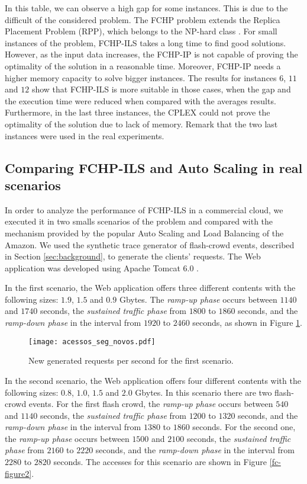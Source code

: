 	In this table, we can observe a high gap for some instances. This is due to the difficult of the considered problem. The FCHP problem extends the Replica Placement Problem (RPP), which belongs to the NP-hard class \cite{aioffi05}. For small instances of the problem,  FCHP-ILS   takes a long time to find good solutions. However, as the input data increases, the FCHP-IP is not capable of proving the optimality of the solution in a reasonable time. Moreover,  FCHP-IP needs a higher memory capacity to solve bigger instances.  The results for instances $6$, $11$ and $12$ show that FCHP-ILS is more suitable in those cases, when  the gap and the execution time were reduced when compared with the averages results. Furthermore, in the last three instances, the CPLEX could not prove the optimality of the solution due to lack of memory. Remark that the two last instances were used in the real experiments.
	
\subsection{Comparing FCHP-ILS and Auto Scaling in real scenarios}	
		
	In order to analyze the performance of  FCHP-ILS  in a  commercial cloud, we executed it in two smalls scenarios of the problem and compared with the mechanism provided by the  popular  Auto Scaling and Load Balancing of the Amazon.
	We used the synthetic trace generator of flash-crowd events,  described in Section \ref{sec:background}, to generate the  clients'  requests.  The  Web application was developed using Apache Tomcat $6.0$ \cite{tomcat}.
	
	In the first scenario, the Web application offers  three different contents  with  the following sizes: $1.9$, $1.5$ and $0.9$ Gbytes. The \textit{ramp-up phase} occurs between $1140$ and $1740$ seconds, the \textit{sustained traffic phase} from $1800$ to $1860$ seconds,  and the \textit{ramp-down phase} in the interval from $1920$ to $2460$ seconds, as shown in  Figure \ref{fc-figure1}. 
	
	\begin{figure}[ht]
\centering
\begin{center}
\texttt{[image: acessos\_seg\_novos.pdf]} 
\end{center}
\caption{New generated requests per second for the first scenario.}
\label{fc-figure1}
\end{figure}

	
	In the second scenario, the Web application offers four different contents  with  the following sizes: $0.8$, $1.0$, $1.5$ and $2.0$ Gbytes. In this scenario there are two flash-crowd events. For the first flash crowd, the \textit{ramp-up phase} occurs between $540$ and $1140$ seconds, the \textit{sustained traffic phase} from $1200$ to $1320$ seconds,  and the \textit{ramp-down phase} in the interval from $1380$ to $1860$ seconds. For the second one,  the \textit{ramp-up phase} occurs between $1500$ and $2100$ seconds, the \textit{sustained traffic phase} from $2160$ to $2220$ seconds,  and the \textit{ramp-down phase} in the interval from $2280$ to $2820$ seconds. The accesses for this scenario are shown in Figure \ref{fc-figure2}. 
	

